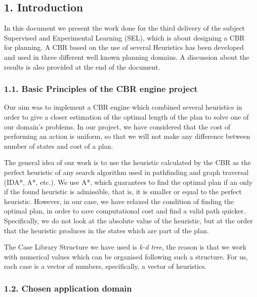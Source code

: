 \documentclass[11pt]{article}
\begin{document}
    \subsection{1. Introduction}\label{introduction}

In this document we present the work done for the third delivery of the
subject Supervised and Experimental Learning (SEL), which is about
designing a CBR for planning. A CBR based on the use of several
Heuristics has been developed and used in three different well known
planning domains. A discussion about the results is also provided at the
end of the document.

\subsubsection{1.1. Basic Principles of the CBR engine
project}\label{basic-principles-of-the-cbr-engine-project}

Our aim was to implement a CBR engine which combined several heuristics
in order to give a closer estimation of the optimal length of the plan
to solve one of our domain's problems. In our project, we have
considered that the cost of performing an action is uniform, so that we
will not make any difference between number of states and cost of a
plan.

The general idea of our work is to use the heuristic calculated by the
CBR as the perfect heuristic of any search algorithm used in pathfinding
and graph traversal (IDA*, A*, etc.). We use A*, which guarantees to
find the optimal plan if an only if the found heuristic is admissible,
that is, it is smaller or equal to the perfect heuristic. However, in
our case, we have relaxed the condition of finding the optimal plan, in
order to save computational cost and find a valid path quicker.
Specifically, we do not look at the absolute value of the heuristic, but
at the order that the heuristic produces in the states which are part of
the plan.

The Case Library Structure we have used is \emph{k-d tree}, the reason
is that we work with numerical values which can be organised following
such a structure. For us, each case is a vector of numbers,
specifically, a vector of heuristics.

\subsubsection{1.2. Chosen application
domain}\label{chosen-application-domain}
\end{document}
